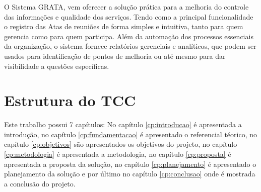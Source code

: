 O Sistema GRATA, vem oferecer a solução prática para a melhoria do controle das informações e qualidade dos serviços. Tendo como a principal funcionalidade o registro das Atas de reuniões de forma simples e intuitiva, tanto para quem gerencia como para quem participa. Além da automação dos processos essenciais da organização, o sistema fornece relatórios gerenciais e analíticos, que podem ser usados para identificação de pontos de melhoria ou até mesmo para dar visibilidade a questões específicas.

\section{Estrutura do TCC}

Este trabalho possui 7 capítulos: No capítulo \ref{cp:introducao} é apresentada a introdução, no capítulo \ref{cp:fundamentacao} é apresentado o referencial téorico, no capítulo \ref{cp:objetivos} são apresentados os objetivos do projeto, no capítulo \ref{cp:metodologia} é apresentada a metodologia, no capítulo \ref{cp:proposta} é apresentada a proposta da solução, no capítulo \ref{cp:planejamento} é apresentado o planejamento da solução e por último no capítulo \ref{cp:conclusao} onde é mostrada a conclusão do projeto.